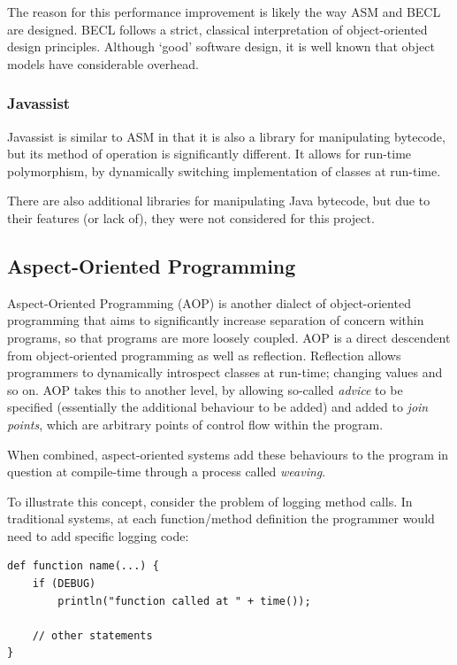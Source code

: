 		The reason for this performance improvement is likely the way ASM and BECL are designed. BECL follows a strict, classical interpretation of object-oriented design principles. Although `good' software design, it is well known that object models have considerable overhead.

		\subsubsection{Javassist} \label{sec:instrumentation/alt-instr/bytecode-instr/javassist}
		Javassist \citep{Chiba1998} is similar to ASM in that it is also a library for manipulating bytecode, but its method of operation is significantly different. It allows for run-time polymorphism, by dynamically switching implementation of classes at run-time.
	
		There are also additional libraries for manipulating Java bytecode, but due to their features (or lack of), they were not considered for this project.

	\subsection{Aspect-Oriented Programming} \label{sec:instrumentation/alt-instr/aop}
	Aspect-Oriented Programming (AOP) \citep{Kiczales1997} is another dialect of object-oriented programming that aims to significantly increase separation of concern within programs, so that programs are more loosely coupled. AOP is a direct descendent from object-oriented programming as well as reflection. Reflection allows programmers to dynamically introspect classes at run-time; changing values and so on. AOP takes this to another level, by allowing so-called \textit{advice} to be specified (essentially the additional behaviour to be added) and added to \textit{join points}, which are arbitrary points of control flow within the program.
	
	When combined, aspect-oriented systems add these behaviours to the program in question at compile-time through a process called \textit{weaving}.
	
	To illustrate this concept, consider the problem of logging method calls. In traditional systems, at each function/method definition the programmer would need to add specific logging code:
	
	\begin{lstlisting}[caption=Traditional use of advice in programs,label=lst:tradadvice]
def function name(...) {
    if (DEBUG)
        println("function called at " + time());
      
    // other statements
}\end{lstlisting}
	

